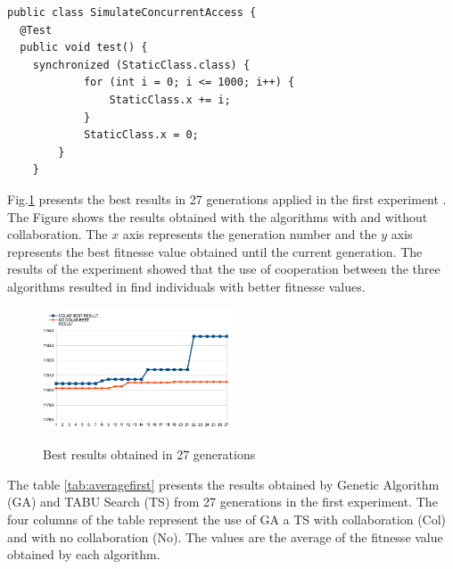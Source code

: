 
\begin{lstlisting}[style=outline,caption={SimulateConcurrentAcess class},label=classsimulated]
public class SimulateConcurrentAccess {
  @Test
  public void test() {		
    synchronized (StaticClass.class) {
			for (int i = 0; i <= 1000; i++) {
				StaticClass.x += i;
			}
			StaticClass.x = 0;
		}
	}
\end{lstlisting}


Fig.\ref{fig:exp1bestresults} presents the best results in 27 generations applied in the first experiment . The Figure shows the results obtained with the algorithms with and without collaboration. The $x$ axis  represents the generation number and the $y$ axis represents the best fitnesse value obtained until the current generation. The results of the experiment showed that the use of cooperation between the three algorithms resulted in find individuals with better fitnesse values.

\begin{figure}[h]
\centering
\caption{Best results obtained in 27 generations}
\includegraphics[width=0.5\textwidth]{./images/exp1bestresults.png}
\label{fig:exp1bestresults}
\end{figure}
The table \ref{tab:averagefirst} presents the results obtained by Genetic Algorithm (GA) and TABU Search (TS) from 27 generations in the first experiment. The four columns of the table represent the use of GA a TS with collaboration  (Col) and with no collaboration (No).  The values are the average of the fitnesse value obtained by each algorithm. 

